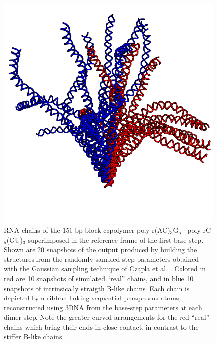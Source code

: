 \begin{figure}
\centering
\includegraphics[angle=0, scale=0.6]{Chapter4/states2.png}
\caption{RNA   chains    of   the   150-bp    block   copolymer   poly
  r(AC)$_{\text{3}}$G$_{\text{5}}\cdot$                            poly
  rC$_{\text{5}}$(GU)$_{\text{3}}$ superimposed in the reference frame
  of  the first  base  step.  Shown  are  20 snapshots  of the  output
  produced  by  building  the  structures from  the  randomly  sampled
  step-parameters  obtained with  the Gaussian  sampling  technique of
  Czapla et al. \cite{czapla2006}. Colored  in red are 10 snapshots of
  simulated ``real'' chains, and in blue 10 snapshots of intrinsically
  straigth B-like chains.  Each chain  is depicted by a ribbon linking
  sequential  phosphorus  atoms,  reconstructed  using 3DNA  from  the
  base-step  parameters at each  dimer step.  Note the  greater curved
  arrangements for the  red ``real'' chains which bring  their ends in
  close contact, in contrast to the stiffer B-like chains.}
\label{fig:rnatree}
\end{figure}  










